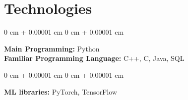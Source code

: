 \documentclass[10pt, letterpaper]{article}
\newenvironment{highlights}{
    \begin{itemize}[
        topsep=0.10 cm,
        parsep=0.10 cm,
        partopsep=0pt,
        itemsep=0pt,
        leftmargin=0 cm + 10pt
    ]
}{
    \end{itemize}
} %
\newenvironment{onecolentry}{
    \begin{adjustwidth}{
        0 cm + 0.00001 cm
    }{
        0 cm + 0.00001 cm
    }
}{
    \end{adjustwidth}
} %
\newenvironment{twocolentry}[2][]{
    \onecolentry
    \def\secondColumn{#2}
    \setcolumnwidth{\fill, 4.5 cm}
    \begin{paracol}{2}
}{
    \switchcolumn \raggedleft \secondColumn
    \end{paracol}
    \endonecolentry
} %
\begin{document}



    \section{Technologies}
        \begin{onecolentry}
            \textbf{Main Programming:} Python \\
            \textbf{Familiar Programming Language:}  C++, C, Java, SQL

        \end{onecolentry}

        \vspace{0.2 cm}

        \begin{onecolentry}
            \textbf{ML libraries:} PyTorch, TensorFlow
        \end{onecolentry}
\end{document}
